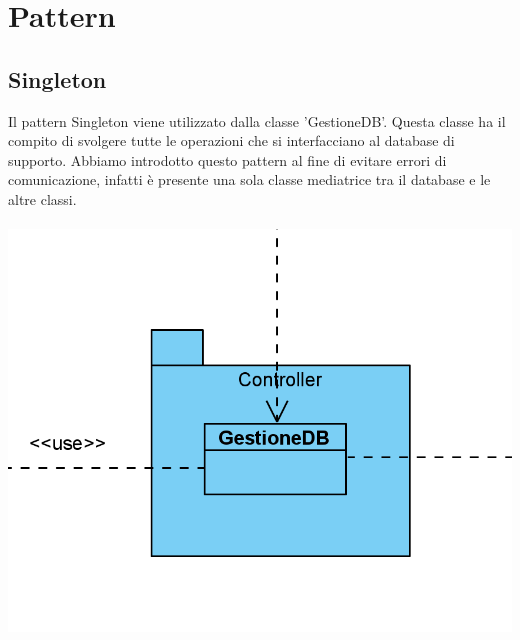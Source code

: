 \documentclass[a4paper, titlepage]{article}
\begin{document}
\section{Pattern}
\vphantom{}
\subsection{Singleton}
Il pattern Singleton viene utilizzato dalla classe 'GestioneDB'. Questa classe ha il compito di svolgere tutte le operazioni che si interfacciano al database di supporto. Abbiamo introdotto questo pattern al fine di evitare errori di comunicazione, infatti è presente una sola classe mediatrice tra il database e le altre classi.\\\\
\includegraphics[scale=0.80]{Immagini/Singleton.png}
\end{document}
